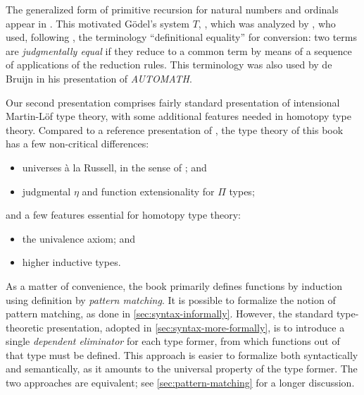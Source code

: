 
The generalized form of primitive recursion for natural numbers and ordinals
appear in \cite{Hilbert-1925}. This motivated G\"odel's system $T$,
\cite{Goedel-T-1958}, which was analyzed by \cite{Tait-1966}, who used,
following \cite{Goedel-T-1958}, the terminology ``definitional equality'' for
conversion: two terms are \emph{judgmentally equal} if they reduce to a
common term by means of a sequence of applications of the reduction
rules. This terminology was also used by de Bruijn \cite{deBruijn-1973} in his
presentation of \emph{AUTOMATH}.

Our second presentation comprises fairly standard presentation of
intensional Martin-L\"{o}f type theory, with some additional features needed in
homotopy type theory. Compared to a reference presentation of
\cite{hofmann:syntax-and-semantics}, the type theory of this book has a few
non-critical differences:
%
\begin{itemize}
\item universes \`{a} la Russell, in the sense of
\cite{martin-lof:bibliopolis}; and
\item judgmental $\eta$ and function extensionality for $\Pi$ types;
\end{itemize}
and a few features essential for homotopy type theory:
\begin{itemize}
\item the univalence axiom; and
\item higher inductive types.
\end{itemize}
%
As a matter of convenience, the book primarily defines functions by induction
using definition by \emph{pattern matching}.
%
%
It is possible to formalize the
notion of pattern matching, as done in \cref{sec:syntax-informally}. However, the
standard type-theoretic presentation, adopted in \cref{sec:syntax-more-formally}, is to introduce a single \emph{dependent
eliminator} for each type former, from which functions out of that type must be
defined. This approach is easier to formalize both syntactically and
semantically, as it amounts to the universal property of the type former.
The two approaches are equivalent; see \cref{sec:pattern-matching} for a
longer discussion.

%
%


